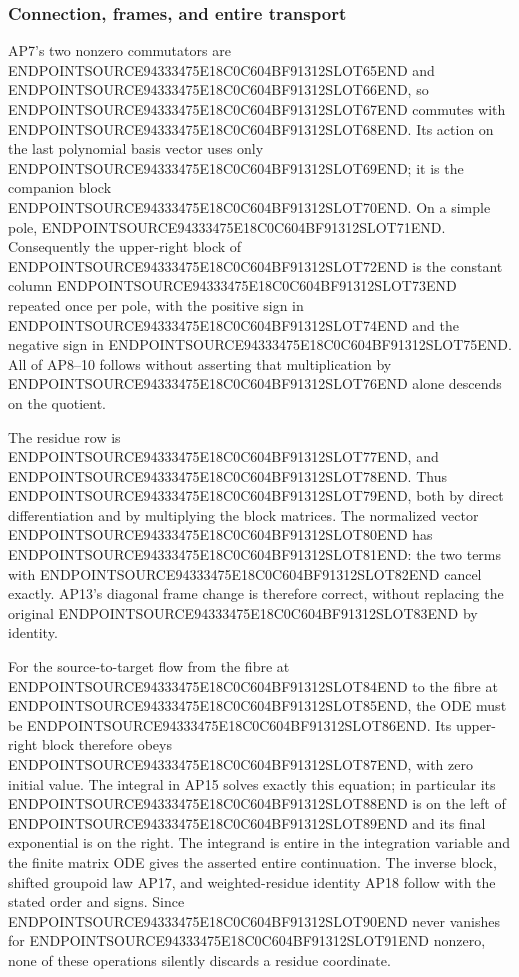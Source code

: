 \subsubsection{Connection, frames, and entire transport}\label{endpoint-analytic_pole_review--connection-frames-and-entire-transport}

AP7's two nonzero commutators are ENDPOINTSOURCE94333475E18C0C604BF91312SLOT65END and ENDPOINTSOURCE94333475E18C0C604BF91312SLOT66END, so ENDPOINTSOURCE94333475E18C0C604BF91312SLOT67END commutes with ENDPOINTSOURCE94333475E18C0C604BF91312SLOT68END. Its action on the last polynomial basis vector uses only ENDPOINTSOURCE94333475E18C0C604BF91312SLOT69END; it is the companion block ENDPOINTSOURCE94333475E18C0C604BF91312SLOT70END. On a simple pole, ENDPOINTSOURCE94333475E18C0C604BF91312SLOT71END. Consequently the upper-right block of ENDPOINTSOURCE94333475E18C0C604BF91312SLOT72END is the constant column ENDPOINTSOURCE94333475E18C0C604BF91312SLOT73END repeated once per pole, with the positive sign in ENDPOINTSOURCE94333475E18C0C604BF91312SLOT74END and the negative sign in ENDPOINTSOURCE94333475E18C0C604BF91312SLOT75END. All of AP8--10 follows without asserting that multiplication by ENDPOINTSOURCE94333475E18C0C604BF91312SLOT76END alone descends on the quotient.

The residue row is ENDPOINTSOURCE94333475E18C0C604BF91312SLOT77END, and ENDPOINTSOURCE94333475E18C0C604BF91312SLOT78END. Thus ENDPOINTSOURCE94333475E18C0C604BF91312SLOT79END, both by direct differentiation and by multiplying the block matrices. The normalized vector ENDPOINTSOURCE94333475E18C0C604BF91312SLOT80END has ENDPOINTSOURCE94333475E18C0C604BF91312SLOT81END: the two terms with ENDPOINTSOURCE94333475E18C0C604BF91312SLOT82END cancel exactly. AP13's diagonal frame change is therefore correct, without replacing the original ENDPOINTSOURCE94333475E18C0C604BF91312SLOT83END by identity.

For the source-to-target flow from the fibre at ENDPOINTSOURCE94333475E18C0C604BF91312SLOT84END to the fibre at ENDPOINTSOURCE94333475E18C0C604BF91312SLOT85END, the ODE must be ENDPOINTSOURCE94333475E18C0C604BF91312SLOT86END. Its upper-right block therefore obeys ENDPOINTSOURCE94333475E18C0C604BF91312SLOT87END, with zero initial value. The integral in AP15 solves exactly this equation; in particular its ENDPOINTSOURCE94333475E18C0C604BF91312SLOT88END is on the left of ENDPOINTSOURCE94333475E18C0C604BF91312SLOT89END and its final exponential is on the right. The integrand is entire in the integration variable and the finite matrix ODE gives the asserted entire continuation. The inverse block, shifted groupoid law AP17, and weighted-residue identity AP18 follow with the stated order and signs. Since ENDPOINTSOURCE94333475E18C0C604BF91312SLOT90END never vanishes for ENDPOINTSOURCE94333475E18C0C604BF91312SLOT91END nonzero, none of these operations silently discards a residue coordinate.

